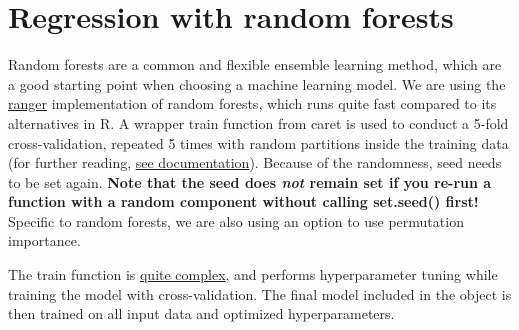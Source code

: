 \documentclass[
  oneside]{book}
\newenvironment{Shaded}{\begin{snugshade}}{\end{snugshade}}
\newcommand{\AttributeTok}[1]{\textcolor[rgb]{0.77,0.63,0.00}{#1}}
\newcommand{\ConstantTok}[1]{\textcolor[rgb]{0.00,0.00,0.00}{#1}}
\newcommand{\DecValTok}[1]{\textcolor[rgb]{0.00,0.00,0.81}{#1}}
\newcommand{\FunctionTok}[1]{\textcolor[rgb]{0.00,0.00,0.00}{#1}}
\newcommand{\NormalTok}[1]{#1}
\newcommand{\OtherTok}[1]{\textcolor[rgb]{0.56,0.35,0.01}{#1}}
\newcommand{\SpecialCharTok}[1]{\textcolor[rgb]{0.00,0.00,0.00}{#1}}
\begin{document}
\begin{Shaded}
\end{Shaded}

\hypertarget{regression-with-random-forests}{%
\section{Regression with random forests}\label{regression-with-random-forests}}

Random forests are a common and flexible ensemble learning method, which are a good starting
point when choosing a machine learning model. We are using the \href{https://github.com/imbs-hl/ranger}{ranger} implementation
of random forests, which runs quite fast compared to its alternatives in R. A wrapper
train function from caret is used to conduct a 5-fold cross-validation, repeated 5 times
with random partitions inside the training data (for further reading, \href{https://topepo.github.io/caret/model-training-and-tuning.html}{see documentation}).
Because of the randomness, seed needs to be set again. \textbf{Note that the seed does \emph{not} remain set if you re-run a function with a random component
without calling set.seed() first!} Specific to random forests, we are also using an option to use permutation
importance.

The train function is \href{https://www.rdocumentation.org/packages/caret/versions/4.47/topics/train}{quite complex}, and performs hyperparameter tuning while training the
model with cross-validation. The final model included in the object is then trained on all
input data and optimized hyperparameters.
\end{document}
